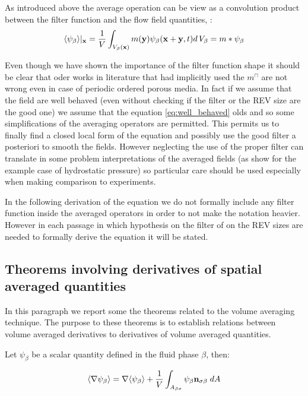 As introduced above the average operation can be view as a convolution product between the filter function and the flow field quantities, \citet{marle1982macroscopic}:
$$
{\left< \psi_{\beta} \right>}|_{\mathbf{x}} = \dfrac{1}{V} \int_{V_\beta(\mathbf{x})} m(\mathbf{y}) \psi_{\beta}(\mathbf{x}+\mathbf{y}, t) d \, V_\beta = m*\psi_{\beta}
$$

Even though we have shown the importance of the filter function shape it should be clear that oder works in literature that had implicitly used the $m^{\sqcap}$ are not wrong even in case of periodic ordered porous media.
In fact if we assume that the field are well behaved (even without checking if the filter or the REV size are the good one) we assume that the equation \eqref{eq:well_behaved} olds and so some simplifications of the averaging operators are permitted.
This permits us to finally find a closed local form of the equation and possibly use the good filter a posteriori to smooth the fields.
However neglecting the use of the proper filter can translate in some problem interpretations of the averaged fields (as \citet{quintard1994transport1} show for the example case of hydrostatic pressure) so particular care should be used especially when making comparison to experiments.

In the following derivation of the equation we do not formally include any filter function inside the averaged operators in order to not make the notation heavier.
However in each passage in which hypothesis on the filter of on the REV sizes are needed to formally derive the equation it will be stated.

\subsection{Theorems involving derivatives of spatial averaged quantities}

In this paragraph we report some the theorems related to the volume averaging technique. The purpose to these theorems is to establish relations between volume averaged derivatives to derivatives of volume averaged quantities.

\begin{theorem}
Let $\psi_{\beta}$ be a scalar quantity defined in the fluid phase $\beta$, then:

	\begin{equation}
		{\left< \nabla \psi_{\beta} \right>} = \nabla {\left< \psi_{\beta} \right>} + \dfrac{1}{V} \int_{A_{\beta \sigma}} \psi_{\beta} \mathbf{n}_{\sigma \beta}   \;dA
			\label{th:spat_avg}
	\end{equation}
\end{theorem}

